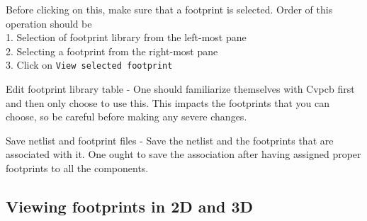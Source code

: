 \begin{compactenum}
  Before clicking on this, make sure that a footprint is selected. Order of this operation should be
  \\ 1. Selection of footprint library from the left-most pane 
  \\ 2. Selecting a footprint from the right-most pane
  \\ 3. Click on \texttt{View selected footprint}
\item Edit footprint library table - One should familiarize themselves with Cvpcb first and then only choose to use this. This impacts the footprints that you can choose, so be careful before making any severe changes.
\item Save netlist and footprint files - Save the netlist and the
  footprints that are associated with it. One ought to save the association after having assigned proper footprints to all the components.
\end{compactenum}

\subsection{Viewing footprints in 2D and 3D}
\label{viewfp}

